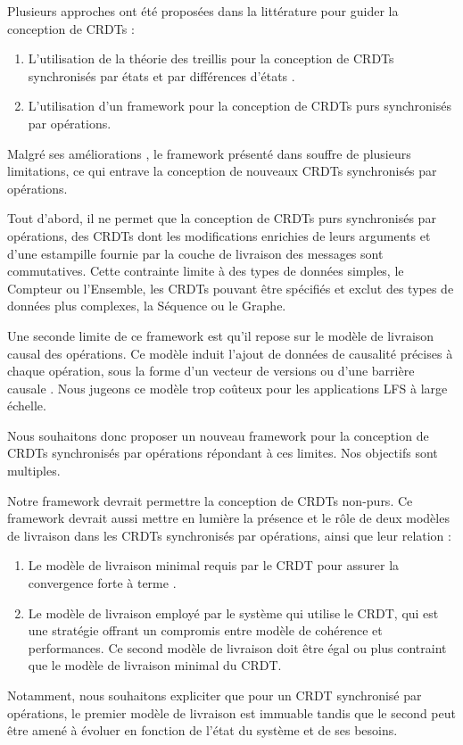 Plusieurs approches ont été proposées dans la littérature pour guider la conception de \acp{CRDT} :
\begin{enumerate}
    \item L'utilisation de la théorie des treillis pour la conception de \acp{CRDT} synchronisés par états et par différences d'états \cite{shapiro_2011_crdt,enes2019}.
    \item L'utilisation d'un framework \cite{baquero2017pure} pour la conception de \acp{CRDT} purs synchronisés par opérations.
\end{enumerate}

Malgré ses améliorations \cite{2020-flec-bauwens,2021-improving-reactivity-pure-op-based-crdts-bauwens}, le framework présenté dans \cite{baquero2017pure} souffre de plusieurs limitations, ce qui entrave la conception de nouveaux \acp{CRDT} synchronisés par opérations.

Tout d'abord, il ne permet que la conception de \acp{CRDT} purs synchronisés par opérations, \ie des \acp{CRDT} dont les modifications enrichies de leurs arguments et d'une estampille fournie par la couche de livraison des messages sont commutatives.
Cette contrainte limite à des types de données simples, \eg le Compteur ou l'Ensemble, les \acp{CRDT} pouvant être spécifiés et exclut des types de données plus complexes, \eg la Séquence ou le Graphe.

Une seconde limite de ce framework est qu'il repose sur le modèle de livraison causal des opérations.
Ce modèle induit l'ajout de données de causalité précises à chaque opération, sous la forme d'un vecteur de versions \cite{1988-version-vector-mattern,1991-version-vector-fidge} ou d'une barrière causale \cite{1997-causal-barrier}.
Nous jugeons ce modèle trop coûteux pour les applications \ac{LFS} à large échelle.

Nous souhaitons donc proposer un nouveau framework pour la conception de \acp{CRDT} synchronisés par opérations répondant à ces limites.
Nos objectifs sont multiples.

Notre framework devrait permettre la conception de \acp{CRDT} non-purs.
Ce framework devrait aussi mettre en lumière la présence et le rôle de deux modèles de livraison dans les \acp{CRDT} synchronisés par opérations, ainsi que leur relation :
\begin{enumerate}
    \item Le modèle de livraison minimal requis par le \ac{CRDT} pour assurer la convergence forte à terme \cite{shapiro_2011_crdt}.
    \item Le modèle de livraison employé par le système qui utilise le \ac{CRDT}, qui est une stratégie offrant un compromis entre modèle de cohérence et performances.
        Ce second modèle de livraison doit être égal ou plus contraint que le modèle de livraison minimal du \ac{CRDT}.
\end{enumerate}
Notamment, nous souhaitons expliciter que pour un \ac{CRDT} synchronisé par opérations, le premier modèle de livraison est immuable tandis que le second peut être amené à évoluer en fonction de l'état du système et de ses besoins.

